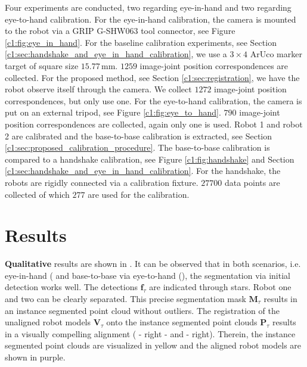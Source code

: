 Four experiments are conducted, two regarding eye-in-hand and two regarding eye-to-hand calibration. For the eye-in-hand calibration, the camera is mounted to the robot via a GRIP G-SHW063 tool connector, see Figure \ref{c1:fig:eye_in_hand}. For the baseline calibration experiments, see Section \ref{c1:sec:handshake_and_eye_in_hand_calibration}, we use a $3\times4$ ArUco marker target of square size $15.77\,\text{mm}$. $1259$ image-joint position correspondences are collected. For the proposed method, see Section \ref{c1:sec:registration}, we have the robot observe itself through the camera. We collect $1272$ image-joint position correspondences, but only use one. For the eye-to-hand calibration, the camera is put on an external tripod, see Figure \ref{c1:fig:eye_to_hand}. $790$ image-joint position correspondences are collected, again only one is used. Robot 1 and robot 2 are calibrated and the base-to-base calibration is extracted, see Section \ref{c1:sec:proposed_calibration_procedure}. The base-to-base calibration is compared to a handshake calibration, see Figure \ref{c1:fig:handshake} and Section \ref{c1:sec:handshake_and_eye_in_hand_calibration}. For the handshake, the robots are rigidly connected via a calibration fixture. $27700$ data points are collected of which $277$ are used for the calibration.

\section{Results}
\label{c1:sec:results}
\textbf{Qualitative} results are shown in . It can be observed that in both scenarios, i.e. eye-in-hand ( and base-to-base via eye-to-hand (), the segmentation via initial detection works well. The detections $\mathbf{f}_\tau$ are indicated through stars. Robot one and two can be clearly separated. This precise segmentation mask $\mathbf{M}_\tau$ results in an instance segmented point cloud without outliers. The registration of the unaligned robot models $\mathbf{V}_\tau$ onto the instance segmented point clouds $\mathbf{P}_\tau$ results in a visually compelling alignment ( - right - and  - right). Therein, the instance segmented point clouds are visualized in yellow and the aligned robot models are shown in purple.

